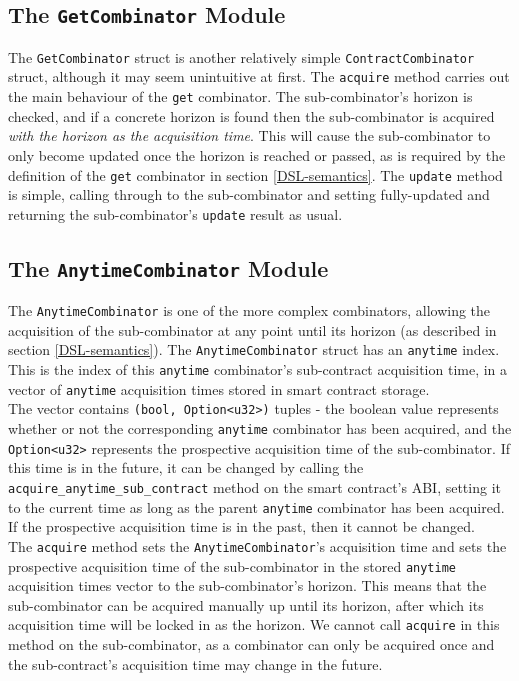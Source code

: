 \subsection{The \texttt{GetCombinator} Module}

The \texttt{GetCombinator} struct is another relatively simple \texttt{ContractCombinator} struct, although it may seem unintuitive at first. The \texttt{acquire} method carries out the main behaviour of the \texttt{get} combinator. The sub-combinator's horizon is checked, and if a concrete horizon is found then the sub-combinator is acquired \textit{with the horizon as the acquisition time}. This will cause the sub-combinator to only become updated once the horizon is reached or passed, as is required by the definition of the \texttt{get} combinator in section \ref{DSL-semantics}. The \texttt{update} method is simple, calling through to the sub-combinator and setting fully-updated and returning the sub-combinator's \texttt{update} result as usual.


\subsection{The \texttt{AnytimeCombinator} Module}

The \texttt{AnytimeCombinator} is one of the more complex combinators, allowing the acquisition of the sub-combinator at any point until its horizon (as described in section \ref{DSL-semantics}). The \texttt{AnytimeCombinator} struct has an \texttt{anytime} index. This is the index of this \texttt{anytime} combinator's sub-contract acquisition time, in a vector of \texttt{anytime} acquisition times stored in smart contract storage. \\

The vector contains \texttt{(bool, Option<u32>)} tuples - the boolean value represents whether or not the corresponding \texttt{anytime} combinator has been acquired, and the \texttt{Option<u32>} represents the prospective acquisition time of the sub-combinator. If this time is in the future, it can be changed by calling the \texttt{acquire\_anytime\_sub\_contract} method on the smart contract's ABI, setting it to the current time as long as the parent \texttt{anytime} combinator has been acquired. If the prospective acquisition time is in the past, then it cannot be changed. \\

The \texttt{acquire} method sets the \texttt{AnytimeCombinator}'s acquisition time and sets the prospective acquisition time of the sub-combinator in the stored \texttt{anytime} acquisition times vector to the sub-combinator's horizon. This means that the sub-combinator can be acquired manually up until its horizon, after which its acquisition time will be locked in as the horizon. We cannot call \texttt{acquire} in this method on the sub-combinator, as a combinator can only be acquired once and the sub-contract's acquisition time may change in the future. \\

